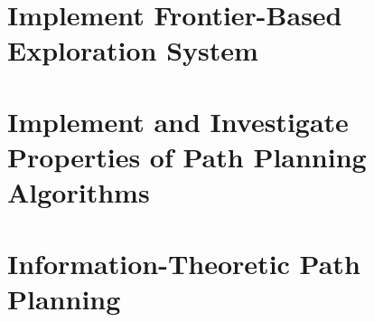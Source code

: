 \documentclass[a4paper,12pt]{article}
\begin{document}
	
	\section{Implement Frontier-Based Exploration System}
	
	
	
	\section{Implement and Investigate Properties of Path Planning Algorithms}
	
	
	
	\section{Information-Theoretic Path Planning}
	
	
	
	\newpage
	
	\appendix
	\appendixpage
	\addappheadtotoc
	
\end{document}
